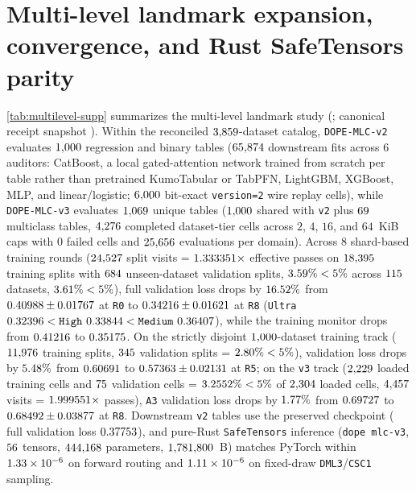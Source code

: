 \documentclass{article}
\begin{document}
\section{Multi-level landmark expansion, convergence, and Rust SafeTensors parity}
\label{sec:supp-multilevel}
\cref{tab:multilevel-supp} summarizes the multi-level landmark study (; canonical receipt snapshot ). Within the reconciled $3{,}859$-dataset catalog, \texttt{DOPE-MLC-v2} evaluates $1{,}000$ regression and binary tables ($65{,}874$ downstream fits across $6$ auditors: CatBoost, a local gated-attention network trained from scratch per table rather than pretrained KumoTabular or TabPFN, LightGBM, XGBoost, MLP, and linear/logistic; $6{,}000$ bit-exact \texttt{version=2} wire replay cells), while \texttt{DOPE-MLC-v3} evaluates $1{,}069$ unique tables ($1{,}000$ shared with \texttt{v2} plus $69$ multiclass tables, $4{,}276$ completed dataset-tier cells across $2$, $4$, $16$, and $64$~KiB caps with $0$ failed cells and $25{,}656$ evaluations per domain). Across $8$ shard-based training rounds ($24{,}527$ split visits = $1.333351\times$ effective passes on $18{,}395$ training splits with $684$ unseen-dataset validation splits, $3.59\% < 5\%$ across $115$ datasets, $3.61\% < 5\%$), full validation loss drops by $16.52\%$ from $0.40988 \pm 0.01767$ at \texttt{R0} to $0.34216 \pm 0.01621$ at \texttt{R8} (\texttt{Ultra} $0.32396 < \texttt{High}\ 0.33844 < \texttt{Medium}\ 0.36407$), while the training monitor drops from $0.41216$ to $0.35175$. On the strictly disjoint $1{,}000$-dataset training track ($11{,}976$ training splits, $345$ validation splits = $2.80\% < 5\%$), validation loss drops by $5.48\%$ from $0.60691$ to $0.57363 \pm 0.02131$ at \texttt{R5}; on the \texttt{v3} track ($2{,}229$ loaded training cells and $75$ validation cells = $3.2552\% < 5\%$ of $2{,}304$ loaded cells, $4{,}457$ visits = $1.999551\times$ passes), \texttt{A3} validation loss drops by $1.77\%$ from $0.69727$ to $0.68492 \pm 0.03877$ at \texttt{R8}. Downstream \texttt{v2} tables use the preserved checkpoint (\texttt{\MlcRoundSeven} full validation loss $0.37753$), and pure-Rust \texttt{SafeTensors} inference (\texttt{dope mlc-v3}, $56$ tensors, $444{,}168$ parameters, $1{,}781{,}800$~B) matches PyTorch within $1.33\times 10^{-6}$ on forward routing and $1.11\times 10^{-6}$ on fixed-draw \texttt{DML3}/\texttt{CSC1} sampling.
\end{document}
